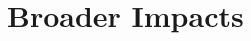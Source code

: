\documentclass[11pt,letterpaper]{article}
\begin{document}

\section{Broader Impacts}
\end{document}
